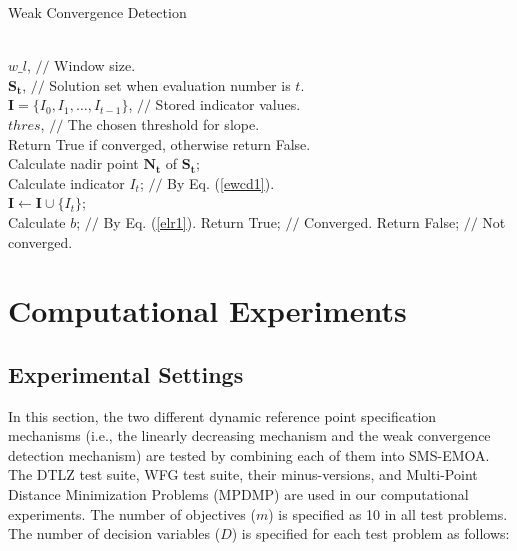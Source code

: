 \documentclass[conference]{IEEEtran}
\begin{document}
\begin{algorithm}
  \caption{Weak Convergence Detection}
  \label{alg:wcd}
  \begin{algorithmic}
  \REQUIRE ~~\\
    $w\_l$, $//$ Window size.\\
    $\boldsymbol{S_{t}}$, $//$ Solution set when evaluation number is $t$.\\
    $\boldsymbol I = \{I_{0},I_{1},\dots,I_{t-1}\}$, $//$ Stored indicator values. \\
    $thres$, $//$ The chosen threshold for slope. \\ 
  \ENSURE Return True if converged, otherwise return False.~~\\
    Calculate nadir point $\boldsymbol{N_{t}}$ of $\boldsymbol{S_{t}}$; \\
    Calculate indicator $I_{t}$; $//$ By Eq. (\ref{ewcd1}). \\
    $\boldsymbol I \gets \boldsymbol I \cup \{I_{t}\}$; \\
    \STATE Calculate $b$; $//$ By Eq. (\ref{elr1}).
      \STATE Return True; $//$ Converged.
      \ENDIF
    \ENDIF
    \STATE Return False; $//$ Not converged.
  \end{algorithmic}
\end{algorithm}
% 
% 
%
\section{Computational Experiments}
\subsection{Experimental Settings}
In this section, the two different dynamic reference point specification mechanisms 
(i.e., the linearly decreasing mechanism and the weak convergence detection mechanism) 
are tested by combining each of them into SMS-EMOA\cite{smsemoa}. 
The DTLZ test suite\cite{DTLZ}, WFG test suite\cite{WFG}, 
their minus-versions\cite{minusTestProblem}, 
and Multi-Point Distance Minimization Problems (MPDMP)\cite{dmp} are used in our computational experiments. 
The number of objectives ($m$) is specified as 10 in all test problems. 
The number of decision variables ($D$) is specified for each test problem as follows: 
\end{document}
